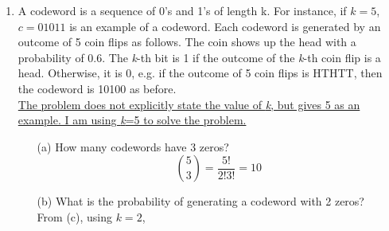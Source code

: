 \documentclass{report}
\begin{document}
\begin{enumerate}
\item A codeword is a sequence of 0’s and 1’s of length k. For instance, if $k = 5$, $c = 01011$ is an example
of a codeword. Each codeword is generated by an outcome of 5 coin flips as follows. The coin shows
up the head with a probability of 0.6. The \textit{k}-th bit is 1 if the outcome of the \textit{k}-th coin flip is a head.
Otherwise, it is 0, e.g. if the outcome of 5 coin flips is HTHTT, then the codeword is 10100 as before.\\
\underline{The problem does not explicitly state the value of \textit{k}, but gives 5 as an}\\ \underline{ example. I am using \textit{k}=5 to solve the problem.}
\begin{itemize}
  \item[(a)] How many codewords have 3 zeros? \\
  $$\binom{5}{3} = \frac{5!}{2!3!} = 10$$
  \item[(b)] What is the probability of generating a codeword with 2 zeros? \\
  From (c), using $k=2$,
\end{itemize}
 \end{enumerate}
 
\end{document}
